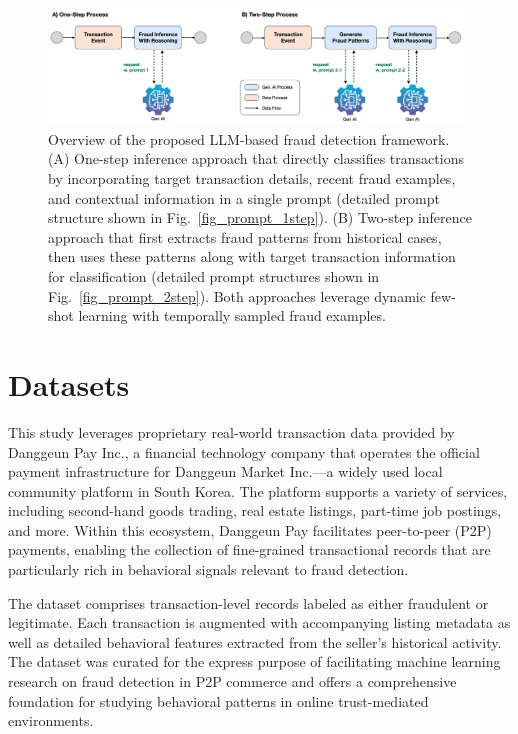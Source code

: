\documentclass[sigconf]{acmart}
\begin{document}
\begin{figure}[t!]
  \centering
  \includegraphics[width=0.98\textwidth]{./figures/fig_process.png}
  \caption{Overview of the proposed LLM-based fraud detection framework. (A) One-step inference approach that directly classifies transactions by incorporating target transaction details, recent fraud examples, and contextual information in a single prompt (detailed prompt structure shown in Fig.~\ref{fig_prompt_1step}). (B) Two-step inference approach that first extracts fraud patterns from historical cases, then uses these patterns along with target transaction information for classification (detailed prompt structures shown in Fig.~\ref{fig_prompt_2step}). Both approaches leverage dynamic few-shot learning with temporally sampled fraud examples.}
  \label{fig_process}
\end{figure}



\section{Datasets}\label{datasets}


This study leverages proprietary real-world transaction data provided by Danggeun Pay Inc., a financial technology company that operates the official payment infrastructure for Danggeun Market Inc.—a widely used local community platform in South Korea. The platform supports a variety of services, including second-hand goods trading, real estate listings, part-time job postings, and more. Within this ecosystem, Danggeun Pay facilitates peer-to-peer (P2P) payments, enabling the collection of fine-grained transactional records that are particularly rich in behavioral signals relevant to fraud detection.



The dataset comprises transaction-level records labeled as either fraudulent or legitimate. Each transaction is augmented with accompanying listing metadata as well as detailed behavioral features extracted from the seller's historical activity. The dataset was curated for the express purpose of facilitating machine learning research on fraud detection in P2P commerce and offers a comprehensive foundation for studying behavioral patterns in online trust-mediated environments.
\end{document}
